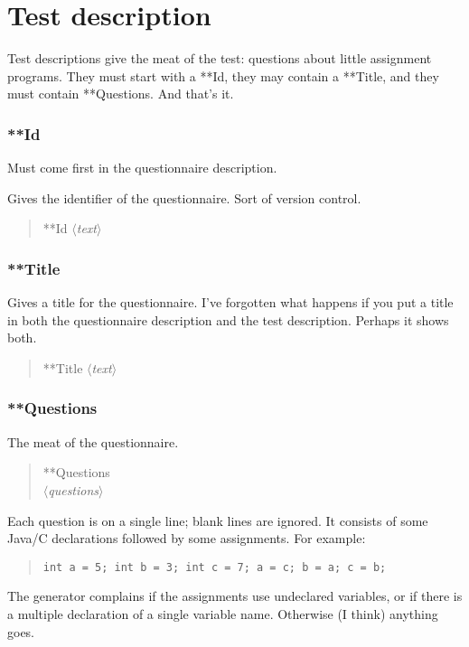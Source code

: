 \documentclass[11pt,a4paper]{article}
\newcommand{\phr}[1]{$\langle$\emph{#1}$\rangle$}
\newcommand{\seclabel}[1]{\label{sec:#1}}
\begin{document}
\newpage
\section{Test description}
\seclabel{testdescription}
Test descriptions give the meat of the test: questions about little assignment programs. They must start with a **Id, they may contain a **Title, and they must contain **Questions. And that's it.

\subsubsection{**Id}
\seclabel{questionnaireid}
Must come first in the questionnaire description.

Gives the identifier of the questionnaire. Sort of version control. 
\begin{quote}
**Id \phr{text}
\end{quote}

\subsubsection{**Title}
Gives a title for the questionnaire. I've forgotten what happens if you put a title in both the questionnaire description and the test description. Perhaps it shows both.
\begin{quote}
**Title \phr{text}
\end{quote}

\subsubsection{**Questions}

The meat of the questionnaire.
\begin{quote}
**Questions \\
\phr{questions}
\end{quote}
Each question is on a single line; blank lines are ignored. It consists of some Java/C declarations followed by some assignments. For example:
\begin{quote}
\begin{verbatim}
int a = 5; int b = 3; int c = 7; a = c; b = a; c = b;
\end{verbatim}
\end{quote}
The generator complains if the assignments use undeclared variables, or if there is a multiple declaration of a single variable name. Otherwise (I think) anything goes.
%
% 
\end{document}
